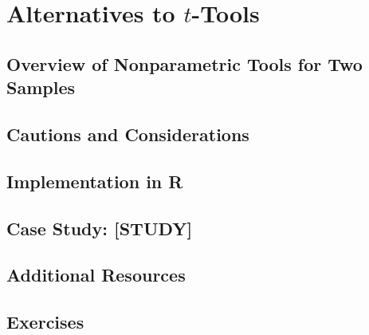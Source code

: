 
\chapter{Alternatives to $t$-Tools}

\section{Overview of Nonparametric Tools for Two Samples}

\section{Cautions and Considerations}

\section{Implementation in R}

\section{Case Study: [STUDY]}

\section{Additional Resources}

\section{Exercises}